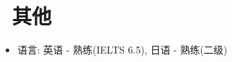 \documentclass{resume}
\begin{document}

\section{\faInfo\ 其他}
\begin{itemize}[parsep=0.5ex]
  \item 语言: 英语 - 熟练(IELTS 6.5), 日语 - 熟练(二级)
\end{itemize}

%
%
\end{document}
